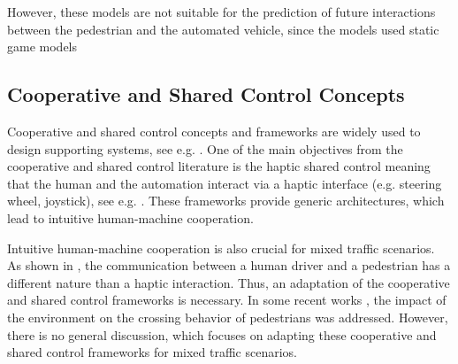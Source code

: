 \documentclass[conference]{IEEEtran}
\newcommand{\rr}[1]{\textcolor{red}{#1}}
\begin{document}
	However, these models are not suitable for the prediction of future interactions between the pedestrian and the automated vehicle, since the models used static game models
	
	\subsection{Cooperative and Shared Control Concepts}
	Cooperative and shared control concepts and frameworks are widely used to design supporting systems, see e.g. \cite{2016_SharedControlSharp_flemisch, 2019_JoiningBluntPointy_flemisch}. One of the main objectives from the cooperative and shared control literature is the haptic shared control meaning that the human and the automation interact via a haptic interface (e.g. steering wheel, joystick), see e.g. \cite{2012_SharingControlHaptics_mulder, 2018_TopologySharedControl_abbink}. These frameworks provide generic architectures, which lead to intuitive human-machine cooperation. 
	
	
	Intuitive human-machine cooperation is also crucial for mixed traffic scenarios. 
	As shown in \cite{2017_AgreeingCrossHow_rasouli}, the communication between a human driver and a pedestrian has a different nature than a haptic interaction. Thus, an adaptation of the cooperative and shared control frameworks is necessary. In some recent works \cite{2021_InfluenceRoadEnvironmental_saito}, the impact of the environment on the crossing behavior of pedestrians was addressed. However, there is no general discussion, which focuses on adapting these cooperative and shared control frameworks for mixed traffic scenarios.
	
	
	
	
	
	
\end{document}
